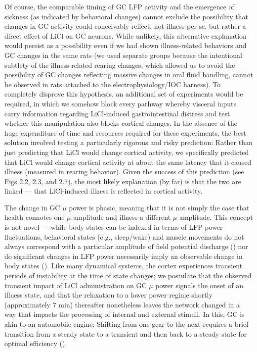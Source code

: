 \begin{refsection}
Of course, the comparable timing of GC LFP activity and the emergence of sickness (as indicated by behavioral changes) cannot exclude the possibility that changes in GC activity could conceivably reflect, not illness per se, but rather a direct effect of LiCl on GC neurons. While unlikely, this alternative explanation would persist as a possibility even if we had shown illness-related behaviors and GC changes in the same rats (we used separate groups because the intentional subtlety of the illness-related rearing changes, which allowed us to avoid the possibility of GC changes reflecting massive changes in oral fluid handling, cannot be observed in rats attached to the electrophysiology/IOC harness). To completely disprove this hypothesis, an additional set of experiments would be required, in which we somehow block every pathway whereby visceral inputs carry information regarding LiCl-induced gastrointestinal distress and test whether this manipulation also blocks cortical changes. In the absence of the huge expenditure of time and resources required for these experiments, the best solution involved testing a particularly rigorous and risky prediction: Rather than just predicting that LiCl would change cortical activity, we specifically predicted that LiCl would change cortical activity at about the same latency that it caused illness (measured in rearing behavior). Given the success of this prediction (see Figs 2.2, 2.3, and 2.7), the most likely explanation (by far) is that the two are linked --- that LiCl-induced illness is reflected in cortical activity.

The change in GC \(\mu\) power is phasic, meaning that it is not simply the case that health connotes one \(\mu\) amplitude and illness a different \(\mu\) amplitude. This concept is not novel --- while body states can be indexed in terms of LFP power fluctuations, behavioral states (e.g., sleep/wake) and muscle movements do not always correspond with a particular amplitude of field potential discharge (\cite{aston-jones1981a}) nor do significant changes in LFP power necessarily imply an observable change in body states (\cite{rojas-l2014a}). Like many dynamical systems, the cortex experiences transient periods of instability at the time of state changes; we postulate that the observed transient impact of LiCl administration on GC \(\mu\) power signals the onset of an illness state, and that the relaxation to a lower power regime shortly (approximately 7 min) thereafter nonetheless leaves the network changed in a way that impacts the processing of internal and external stimuli. In this, GC is akin to an automobile engine: Shifting from one gear to the next requires a brief transition from a steady state to a transient and then back to a steady state for optimal efficiency (\cite{oglieve2017a,horn2006a}).


\end{refsection}
